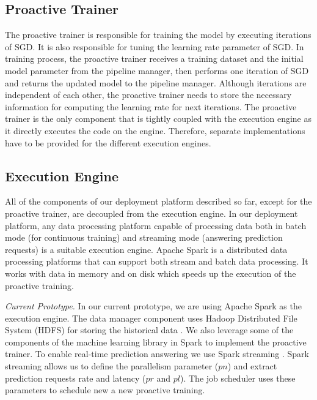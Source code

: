 \subsection{Proactive Trainer} 
The proactive trainer is responsible for training the model by executing iterations of SGD.
It is also responsible for tuning the learning rate parameter of SGD.
In training process, the proactive trainer receives a training dataset and the initial model parameter from the pipeline manager, then performs one iteration of SGD and returns the updated model to the pipeline manager.
Although iterations are independent of each other, the proactive trainer needs to store the necessary information for computing the learning rate for next iterations.
The proactive trainer is the only component that is tightly coupled with the execution engine as it directly executes the code on the engine.
Therefore, separate implementations have to be provided for the different execution engines.

\subsection{Execution Engine}
All of the components of our deployment platform described so far, except for the proactive trainer, are decoupled from the execution engine.
In our deployment platform, any data processing platform capable of processing data both in batch mode (for continuous training) and streaming mode (answering prediction requests) is a suitable execution engine.
Apache Spark \cite{zaharia2010spark} is a distributed data processing platforms that can support both stream and batch data processing.
It works with data in memory and on disk which speeds up the execution of the proactive training.

\textit{Current Prototype.}
In our current prototype, we are using Apache Spark \cite{zaharia2010spark} as the execution engine.
The data manager component uses Hadoop Distributed File System (HDFS) for storing the historical data \cite{shvachko2010hadoop}.
We also leverage some of the components of the machine learning library in Spark to implement the proactive trainer.
To enable real-time prediction answering we use Spark streaming \cite{zaharia2013discretized}.
Spark streaming allows us to define the parallelism parameter ($pn$) and extract prediction requests rate and latency ($pr$ and $pl$).
The job scheduler uses these parameters to schedule new a new proactive training.
